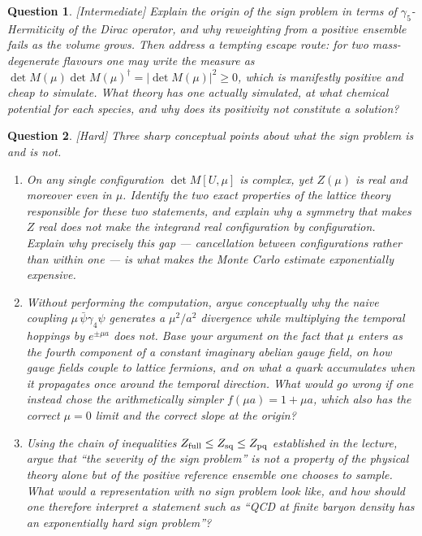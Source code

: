 \documentclass[11pt]{article}
\newcommand{\diff}[1]{\textcolor{blue!60!black}{\footnotesize\textsf{[#1]}}\quad}
\newtheorem{question}{Question}
\begin{document}
\begin{question}
\diff{Intermediate} Explain the origin of the sign problem in terms of $\gamma_5$-Hermiticity of the Dirac operator, and why reweighting from a positive ensemble fails as the volume grows. Then address a tempting escape route: for two mass-degenerate flavours one may write the measure as $\det M(\mu)\det M(\mu)^\dagger = |\det M(\mu)|^2 \geq 0$, which is manifestly positive and cheap to simulate. What theory has one actually simulated, at what chemical potential for each species, and why does its positivity not constitute a solution?
\end{question}

\begin{question}
\diff{Hard} Three sharp conceptual points about what the sign problem is and is not.
\begin{enumerate}[label=(\roman*), leftmargin=*]
  \item On any single configuration $\det M[U,\mu]$ is complex, yet $Z(\mu)$ is real and moreover even in $\mu$. Identify the two exact properties of the lattice theory responsible for these two statements, and explain why a symmetry that makes $Z$ real does \emph{not} make the integrand real configuration by configuration. Explain why precisely this gap --- cancellation \emph{between} configurations rather than within one --- is what makes the Monte Carlo estimate exponentially expensive.
  \item Without performing the computation, argue conceptually why the naive coupling $\mu\,\bar\psi\gamma_4\psi$ generates a $\mu^2/a^2$ divergence while multiplying the temporal hoppings by $e^{\pm\mu a}$ does not. Base your argument on the fact that $\mu$ enters as the fourth component of a constant \emph{imaginary} abelian gauge field, on how gauge fields couple to lattice fermions, and on what a quark accumulates when it propagates once around the temporal direction. What would go wrong if one instead chose the arithmetically simpler $f(\mu a) = 1 + \mu a$, which also has the correct $\mu=0$ limit and the correct slope at the origin?
  \item Using the chain of inequalities $Z_{\rm full} \le Z_{\rm sq} \le Z_{\rm pq}$ established in the lecture, argue that ``the severity of the sign problem'' is not a property of the physical theory alone but of the positive reference ensemble one chooses to sample. What would a representation with no sign problem look like, and how should one therefore interpret a statement such as ``QCD at finite baryon density has an exponentially hard sign problem''?
\end{enumerate}
\end{question}
\end{document}
